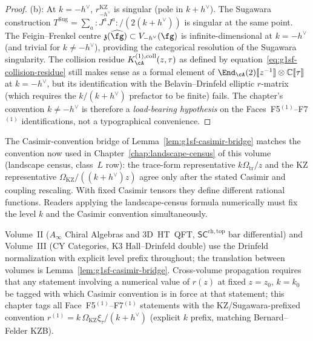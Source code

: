 \begin{proof}
(b): At $k = -h^\vee$, $r^{\mathrm{KZ}}_{-h^\vee}$ is singular (pole
in $k+h^\vee$). The Sugawara construction
$T^{\mathrm{Sug}} = \sum_a {:}J^a J^a{:}/(2(k+h^\vee))$ is
singular at the same point. The Feigin--Frenkel centre
$\mathfrak{z}(\widehat{\fg}) \subset V_{-h^\vee}(\fg)$ is
infinite-dimensional at $k = -h^\vee$ \textup{(}and trivial for
$k \neq -h^\vee$\textup{)}, providing the categorical resolution of
the Sugawara singularity. The collision residue
$K_\cA^{(1),\mathrm{coll}}(z,\tau)$ as defined by
equation~\eqref{eq:g1sf-collision-residue} still makes sense as a
formal element of $\End_\cA(2)[\![z^{-1}]\!] \otimes
\mathbb{C}[\![\tau]\!]$ at $k=-h^\vee$, but its identification with
the Belavin--Drinfeld elliptic $r$-matrix \textup{(}which requires the
$k/(k+h^\vee)$ prefactor to be finite\textup{)} fails. The chapter's
convention $k \neq -h^\vee$ is therefore a \emph{load-bearing hypothesis}
on the Faces~F5$^{(1)}$--F7$^{(1)}$ identifications, not a
typographical convenience.
\end{proof}

\begin{remark}
\label{rem:g1sf-casimir-normalization-check}
The Casimir-convention bridge of Lemma~\ref{lem:g1sf-casimir-bridge}
matches the convention now used in
Chapter~\ref{chap:landscape-census} of this volume
\textup{(}landscape census, class~$L$ row\textup{)}: the trace-form
representative $k\Omega_{\mathrm{tr}}/z$ and the KZ representative
$\Omega_{\mathrm{KZ}}/((k+h^\vee)z)$ agree only after the stated
Casimir and coupling rescaling. With fixed Casimir tensors they define
different rational functions. Readers applying the
landscape-census formula numerically must fix the level $k$ and the
Casimir convention simultaneously.

Volume~II \textup{(}$A_\infty$ Chiral Algebras and 3D~HT~QFT,
$\mathsf{SC}^{\mathrm{ch,top}}$ bar differential\textup{)} and
Volume~III \textup{(}CY Categories, K3 Hall--Drinfeld double\textup{)} use the
Drinfeld normalization with explicit level prefix throughout; the
translation between volumes is Lemma~\ref{lem:g1sf-casimir-bridge}.
Cross-volume propagation requires that any statement involving a
numerical value of $r(z)$ at fixed $z = z_0$, $k = k_0$ be tagged with
which Casimir convention is in force at that statement; this chapter
tags all Face~F5$^{(1)}$--F7$^{(1)}$ statements with the
KZ/Sugawara-prefixed convention
$r^{(1)} = k\,\Omega_{\mathrm{KZ}}\xi_\tau/(k+h^\vee)$
\textup{(}explicit $k$ prefix, matching Bernard--Felder KZB\textup{)}.
\end{remark}


